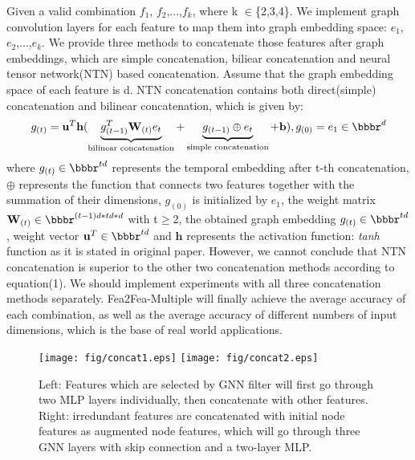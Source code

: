 \documentclass[runningheads]{llncs}
\newcommand{\xhdr}[1]{\vspace{1.7mm}\noindent{{\bf #1}}}
\begin{document}
\xhdr{Feature concatenation}  
Given a valid combination $f_{1}$, $f_{2}$,...,$f_{k}$, where k $\in$\{2,3,4\}. We implement graph convolution layers for each feature to map them into graph embedding space: $e_{1}$, $e_{2}$,...,$e_{k}$. We provide three methods to concatenate those features after graph embeddings, which are simple concatenation, biliear concatenation and neural tensor network(NTN) \cite{NIPS2013_b337e84d} based concatenation. Assume that the graph embedding space of each feature is d. NTN concatenation contains both direct(simple) concatenation and bilinear concatenation, which is given by:
\begin{equation}
  g_{(t)} = \textbf{u}^{T} \textbf{h}(\underbrace{g_{(t-1)}^{T} \textbf{W}_{(t)} e_{t}}_{\text{bilinear    concatenation}} +
  \underbrace{g_{(t-1)} \oplus e_{t}}_{\text{simple concatenation}} + \textbf{b}), g_{(0)} = e_{1}\in \bbbr^{d}\\ 
\end{equation}
where $g_{(t)} \in \bbbr^{td}$ represents the temporal embedding after t-th concatenation, $\oplus$ represents the function that connects two features together with the summation of their dimensions, $g_{(0)}$ is initialized by $e_{1}$, the weight matrix $\textbf{W}_{(t)} \in \bbbr^{(t-1)d * td * d} $ with t$\geq$2, the obtained graph embedding $g_{(t)} \in \bbbr^{td}$,
weight vector $\textbf{u}^{T} \in \bbbr^{td}$ and $\textbf{h}$ represents the activation function: \textit{tanh} function as it is stated in original paper. However, we cannot conclude that NTN concatenation is superior to the other two concatenation methods according to equation(1). We should implement experiments with all three concatenation methods separately. Fea2Fea-Multiple will finally achieve the average accuracy of each combination, as well as the average accuracy of different numbers of input dimensions, which is the base of real world applications.
\begin{figure}[!tp]
  \centering
  \begin{center}
    \hspace*{-1in}
      \texttt{[image: fig/concat1.eps]}
      \texttt{[image: fig/concat2.eps]}
      \hspace*{-1in}
      \caption{Left: Features which are selected by GNN filter will first go through two MLP layers individually, then concatenate with other features. Right: irredundant features are concatenated with initial node features as augmented node features, which will go through three GNN layers with skip connection and a two-layer MLP. }
    \end{center}
  \end{figure}
\vspace{-0.5cm}
\end{document}
